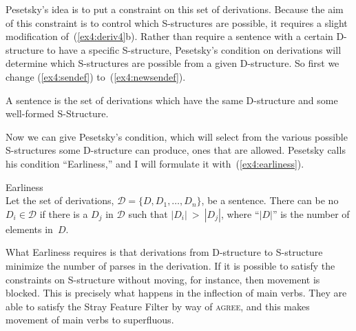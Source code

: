 Pesetsky's idea is to put a constraint on this set of derivations. Because the aim of this constraint is to control which S-structures are possible, it requires a slight modification of~(\ref{ex4:deriv4}b). Rather than require a sentence with a certain D-structure to have a specific S-structure, Pesetsky's condition on derivations will determine which S-structures are possible from a given D-structure. So first we change (\ref{ex4:sendef}) to~(\ref{ex4:newsendef}).
\begin{exe}
	\raggedright
	\ex \label{ex4:newsendef}
	A sentence is the set of derivations which have the same D-structure and some well-formed S-Structure.
\end{exe}
Now we can give Pesetsky's condition, which will select from the various possible S-structures some D-structure can produce, ones that are allowed. Pesetsky calls his condition ``Earliness,'' and I will formulate it with~(\ref{ex4:earliness}).
\begin{exe}
\ex \label{ex4:earliness} Earliness\\
Let the set of derivations, $\mathscr{D} = \{ D, D_1,\ldots,D_n \}$, be a sentence. There can be no $D_i \in \mathscr{D}$ if there is a $D_j$ in $\mathscr{D}$ such that $|D_i|\ >\ |D_j|$, where ``$|D|$'' is the number of elements in~$D$.
\end{exe}
What Earliness requires is that derivations from D-structure to S-structure minimize the number of parses in the derivation. If it is possible to satisfy the constraints on S-structure without moving, for instance, then movement is blocked. This is precisely what happens in the inflection of main verbs. They are able to satisfy the Stray Feature Filter by way of \textsc{agree}, and this makes movement of main verbs to  superfluous.

